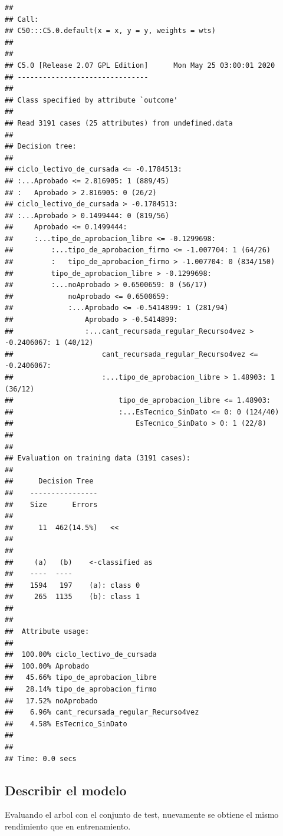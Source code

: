 \documentclass[]{article}
\begin{document}
\begin{lstlisting}
## 
## Call:
## C50:::C5.0.default(x = x, y = y, weights = wts)
## 
## 
## C5.0 [Release 2.07 GPL Edition]      Mon May 25 03:00:01 2020
## -------------------------------
## 
## Class specified by attribute `outcome'
## 
## Read 3191 cases (25 attributes) from undefined.data
## 
## Decision tree:
## 
## ciclo_lectivo_de_cursada <= -0.1784513:
## :...Aprobado <= 2.816905: 1 (889/45)
## :   Aprobado > 2.816905: 0 (26/2)
## ciclo_lectivo_de_cursada > -0.1784513:
## :...Aprobado > 0.1499444: 0 (819/56)
##     Aprobado <= 0.1499444:
##     :...tipo_de_aprobacion_libre <= -0.1299698:
##         :...tipo_de_aprobacion_firmo <= -1.007704: 1 (64/26)
##         :   tipo_de_aprobacion_firmo > -1.007704: 0 (834/150)
##         tipo_de_aprobacion_libre > -0.1299698:
##         :...noAprobado > 0.6500659: 0 (56/17)
##             noAprobado <= 0.6500659:
##             :...Aprobado <= -0.5414899: 1 (281/94)
##                 Aprobado > -0.5414899:
##                 :...cant_recursada_regular_Recurso4vez > -0.2406067: 1 (40/12)
##                     cant_recursada_regular_Recurso4vez <= -0.2406067:
##                     :...tipo_de_aprobacion_libre > 1.48903: 1 (36/12)
##                         tipo_de_aprobacion_libre <= 1.48903:
##                         :...EsTecnico_SinDato <= 0: 0 (124/40)
##                             EsTecnico_SinDato > 0: 1 (22/8)
## 
## 
## Evaluation on training data (3191 cases):
## 
##      Decision Tree   
##    ----------------  
##    Size      Errors  
## 
##      11  462(14.5%)   <<
## 
## 
##     (a)   (b)    <-classified as
##    ----  ----
##    1594   197    (a): class 0
##     265  1135    (b): class 1
## 
## 
##  Attribute usage:
## 
##  100.00% ciclo_lectivo_de_cursada
##  100.00% Aprobado
##   45.66% tipo_de_aprobacion_libre
##   28.14% tipo_de_aprobacion_firmo
##   17.52% noAprobado
##    6.96% cant_recursada_regular_Recurso4vez
##    4.58% EsTecnico_SinDato
## 
## 
## Time: 0.0 secs
\end{lstlisting}

\hypertarget{describir-el-modelo-4}{%
\subsection{Describir el modelo}\label{describir-el-modelo-4}}

Evaluando el arbol con el conjunto de test, nuevamente se obtiene el
mismo rendimiento que en entrenamiento.
\end{document}
